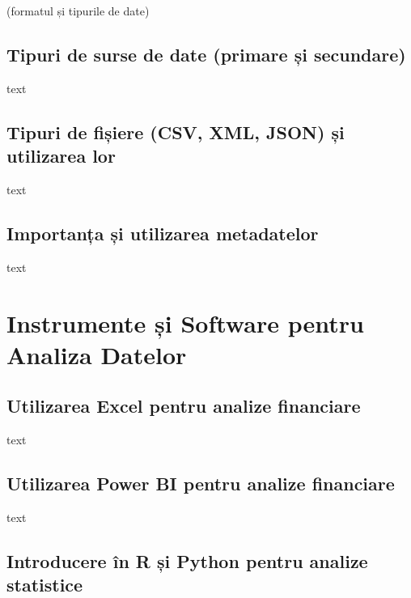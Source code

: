 \documentclass[
  11pt,
  b5paper,
  nottoc]{book}
\begin{document}
(formatul și tipurile de date)

\hypertarget{tipuri-de-surse-de-date-primare-ux219i-secundare}{%
\subsection{Tipuri de surse de date (primare și
secundare)}\label{tipuri-de-surse-de-date-primare-ux219i-secundare}}

text

\hypertarget{tipuri-de-fiux219iere-csv-xml-json-ux219i-utilizarea-lor}{%
\subsection{Tipuri de fișiere (CSV, XML, JSON) și utilizarea
lor}\label{tipuri-de-fiux219iere-csv-xml-json-ux219i-utilizarea-lor}}

text

\hypertarget{importanux21ba-ux219i-utilizarea-metadatelor}{%
\subsection{Importanța și utilizarea
metadatelor}\label{importanux21ba-ux219i-utilizarea-metadatelor}}

text

\hypertarget{instrumente-ux219i-software-pentru-analiza-datelor}{%
\section{Instrumente și Software pentru Analiza
Datelor}\label{instrumente-ux219i-software-pentru-analiza-datelor}}

\hypertarget{utilizarea-excel-pentru-analize-financiare}{%
\subsection{Utilizarea Excel pentru analize
financiare}\label{utilizarea-excel-pentru-analize-financiare}}

text

\hypertarget{utilizarea-power-bi-pentru-analize-financiare}{%
\subsection{Utilizarea Power BI pentru analize
financiare}\label{utilizarea-power-bi-pentru-analize-financiare}}

text

\hypertarget{introducere-uxeen-r-ux219i-python-pentru-analize-statistice}{%
\subsection{Introducere în R și Python pentru analize
statistice}\label{introducere-uxeen-r-ux219i-python-pentru-analize-statistice}}
\end{document}
